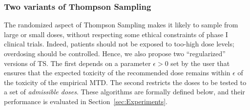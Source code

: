 % 

\subsubsection{Two variants of Thompson Sampling}

The randomized aspect of Thompson Sampling makes it likely to sample from large or small doses, without respecting some ethical constraints of phase I clinical trials. Indeed, patients should not be exposed to too-high dose levels; overdosing should be controlled. Hence, we also propose two ``regularized'' versions of TS. The first depends on a parameter $\epsilon>0$ set by the user that ensures that the expected toxicity of the recommended dose remains within $\epsilon$ of the toxicity of the empirical MTD. The second restricts the doses to be tested to a set of \emph{admissible doses}. These algorithms are formally defined below, and their performance is evaluated in Section~\ref{sec:Experiments}.


